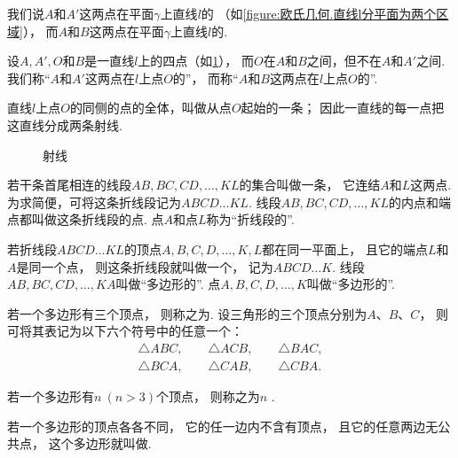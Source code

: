 \begin{definition}
我们说\(A\)和\(A'\)这两点在平面\(\gamma\)上直线\(l\)的%
（如\cref{figure:欧氏几何.直线l分平面为两个区域}），
而\(A\)和\(B\)这两点在平面\(\gamma\)上直线\(l\)的.
\end{definition}

\begin{definition}
设\(A,A',O\)和\(B\)是一直线\(l\)上的四点（如\cref{figure:欧氏几何.射线}），
而\(O\)在\(A\)和\(B\)之间，但不在\(A\)和\(A'\)之间.
我们称“\(A\)和\(A'\)这两点在\(l\)上点\(O\)的”，
而称“\(A\)和\(B\)这两点在\(l\)上点\(O\)的”.

直线\(l\)上点\(O\)的同侧的点的全体，叫做从点\(O\)起始的一条；
因此一直线的每一点把这直线分成两条射线.
\begin{figure}[ht]
\centering
{}
\caption{射线}
\label{figure:欧氏几何.射线}
\end{figure}
\end{definition}

\begin{definition}
若干条首尾相连的线段\(AB,BC,CD,\dotsc,KL\)的集合叫做一条，
它连结\(A\)和\(L\)这两点.
为求简便，可将这条折线段记为\(ABCD \dotso KL\).
线段\(AB,BC,CD,\dotsc,KL\)的内点和端点都叫做这条折线段的点.
点\(A\)和点\(L\)称为“折线段的”.

若折线段\(ABCD \dotso KL\)的顶点\(A,B,C,D,\dotsc,K,L\)都在同一平面上，
且它的端点\(L\)和\(A\)是同一个点，
则这条折线段就叫做一个，
记为\(ABCD \dotso K\).
线段\(AB,BC,CD,\dotsc,KA\)叫做“多边形的”.
点\(A,B,C,D,\dotsc,K\)叫做“多边形的”.

若一个多边形有三个顶点，
则称之为.
设三角形的三个顶点分别为\(A\)、\(B\)、\(C\)，
则可将其表记为以下六个符号中的任意一个：
\[
\begin{split}
\triangle ABC, \qquad
\triangle ACB, \qquad
\triangle BAC, \\
\triangle BCA, \qquad
\triangle CAB, \qquad
\triangle CBA.
\end{split}
\]

若一个多边形有\(n\ (n>3)\)个顶点，
则称之为\(n\) .

若一个多边形的顶点各各不同，
它的任一边内不含有顶点，
且它的任意两边无公共点，
这个多边形就叫做.
\end{definition}

